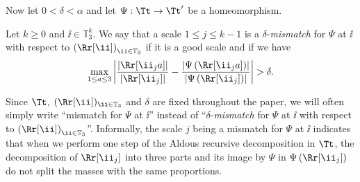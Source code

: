 Now let $0<\delta<\alpha$ and let $\Psi: \Tt \to \Tt'$ be a homeomorphism.
\begin{definition}\label{defn_mismatch}
Let $k \geq 0$ and $\ii \in \mathbb{T}_3^k$. We say that a scale $1 \leq j \leq k-1$ is a $\delta$-\emph{mismatch} for $\Psi$ at $\ii$ with respect to $\left( \Rr[\ii] \right)_{\ii \in \mathbb{T}_3}$ if it is a good scale and if we have
\[ \max_{1 \leq a \leq 3} \left| \frac{\left| \Rr[\ii_j a] \right|}{\left| \Rr[\ii_j] \right|}-\frac{\left| \Psi \left( \Rr[\ii_j a] \right) \right|}{\left| \Psi \left( \Rr[\ii_j] \right) \right|} \right|>\delta. \]
\end{definition}
Since $\Tt$, $(\Rr[\ii])_{\ii \in \mathbb{T}_3}$ and $\delta$ are fixed throughout the paper, we will often simply write ``mismatch for $\Psi$ at $\ii$'' instead of ``$\delta$-\emph{mismatch} for $\Psi$ at $\ii$ with respect to $\left( \Rr[\ii] \right)_{\ii \in \mathbb{T}_3}$''.
Informally, the scale $j$ being a mismatch for $\Psi$ at $\ii$ indicates that when we perform one step of the Aldous recursive decomposition in $\Tt$, the decomposition of $\Rr[\ii_j]$ into three parts and its image by $\Psi$ in $\Psi \left( \Rr[\ii_j] \right)$ do not split the masses with the same proportions.

